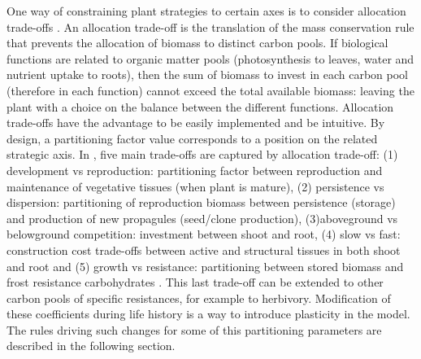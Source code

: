 One way of constraining plant strategies to certain axes is to consider allocation trade-offs \cite{kleidon_global_2000, reineking_environmental_2006}. An allocation trade-off is the translation of the mass conservation rule that prevents the allocation of biomass to distinct carbon pools. If biological functions are related to organic matter pools (photosynthesis to leaves, water and nutrient uptake to roots), then the sum of biomass to invest in each carbon pool (therefore in each function) cannot exceed the total available biomass: leaving the plant with a choice on the balance between the different functions. Allocation trade-offs have the advantage to be easily implemented and be intuitive. By design, a partitioning factor value corresponds to a position on the related strategic axis. In \model, five main trade-offs are captured by allocation trade-off: (1) development vs reproduction: partitioning factor between reproduction and maintenance of vegetative tissues (when plant is mature), (2)  persistence vs dispersion: partitioning of reproduction biomass between persistence (storage) and production of new propagules (seed/clone production), (3)aboveground vs belowground competition: investment between shoot and root, \cite{kleidon_global_2000, reineking_environmental_2006, taubert_modelling_2014}(4) slow vs fast: construction cost trade-offs between active and structural tissues in both shoot and root and (5) growth vs resistance: partitioning between stored biomass and frost resistance carbohydrates \cite{cai_changes_2004}. This last trade-off can be extended to other carbon pools of specific resistances, for example to herbivory. Modification of these coefficients during life history is a way to introduce plasticity in the model. The rules driving such changes for some of this partitioning parameters are described in the following section.\\


